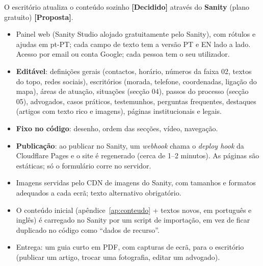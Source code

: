 \documentclass[11pt,a4paper]{article}
\newcommand{\decidido}{\textcolor{verde700}{\textbf{[Decidido]}}}
\newcommand{\proposta}{\textcolor{bronze}{\textbf{[Proposta]}}}
\begin{document}
O escritório atualiza o conteúdo sozinho \decidido{} através do \textbf{Sanity} (plano gratuito) \proposta.
\begin{itemize}
  \item Painel web (Sanity Studio alojado gratuitamente pelo Sanity), com rótulos e ajudas em pt-PT; cada campo de texto tem a versão PT e EN lado a lado. Acesso por email ou conta Google; cada pessoa tem o seu utilizador.
  \item \textbf{Editável}: definições gerais (contactos, horário, números da faixa 02, textos do topo, redes sociais), escritórios (morada, telefone, coordenadas, ligação do mapa), áreas de atuação, situações (secção 04), passos do processo (secção 05), advogados, casos práticos, testemunhos, perguntas frequentes, destaques (artigos com texto rico e imagens), páginas institucionais e legais.
  \item \textbf{Fixo no código}: desenho, ordem das secções, vídeo, navegação.
  \item \textbf{Publicação}: ao publicar no Sanity, um \textit{webhook} chama o \textit{deploy hook} da Cloudflare Pages e o site é regenerado (cerca de 1--2 minutos). As páginas são estáticas; só o formulário corre no servidor.
  \item Imagens servidas pelo CDN de imagens do Sanity, com tamanhos e formatos adequados a cada ecrã; texto alternativo obrigatório.
  \item O conteúdo inicial (apêndice~\ref{ap:conteudo} + textos novos, em português e inglês) é carregado no Sanity por um script de importação, em vez de ficar duplicado no código como ``dados de recurso''.
  \item Entrega: um guia curto em PDF, com capturas de ecrã, para o escritório (publicar um artigo, trocar uma fotografia, editar um advogado).
\end{itemize}

\end{document}
